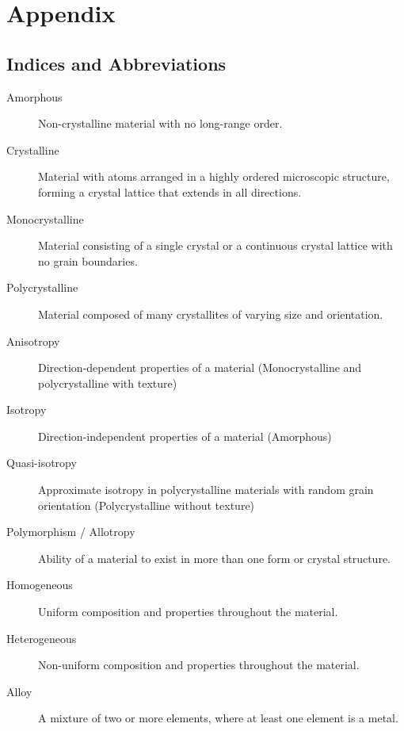\appendix
\section*{Appendix}

\subsection*{Indices and Abbreviations}
\begin{description}
\item[Amorphous] Non-crystalline material with no long-range order.
\item[Crystalline] Material with atoms arranged in a highly ordered microscopic structure, forming a crystal lattice that extends in all directions.
\item[Monocrystalline] Material consisting of a single crystal or a continuous crystal lattice with no grain boundaries.
\item[Polycrystalline] Material composed of many crystallites of varying size and orientation.
\item[Anisotropy] Direction-dependent properties of a material {\color{red}(Monocrystalline and polycrystalline with texture)}
\item[Isotropy] Direction-independent properties of a material {\color{red}(Amorphous)}
\item[Quasi-isotropy] Approximate isotropy in polycrystalline materials with random grain orientation {\color{red}(Polycrystalline without texture)}
\item[Polymorphism / Allotropy] Ability of a material to exist in more than one form or crystal structure.
\item[Homogeneous] Uniform composition and properties throughout the material.
\item[Heterogeneous] Non-uniform composition and properties throughout the material.
\item[Alloy] A mixture of two or more elements, where at least one element is a metal.
\end{description}